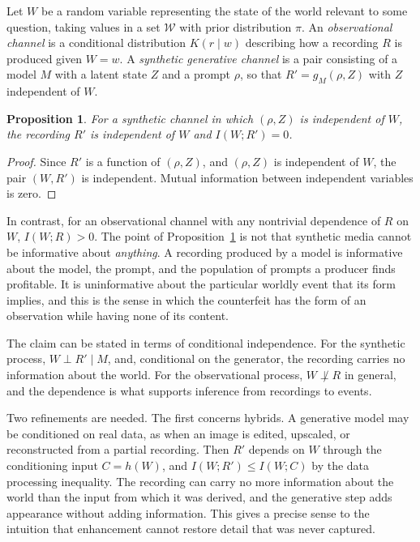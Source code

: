 \documentclass[12pt]{article}
\theoremstyle{plain}
\newtheorem{proposition}{Proposition}
\theoremstyle{definition}
\theoremstyle{remark}
\begin{document}
Let $W$ be a random variable representing the state of the world relevant to some question, taking values in a set $\mathcal{W}$ with prior distribution $\pi$. An \emph{observational channel} is a conditional distribution $K(r \mid w)$ describing how a recording $R$ is produced given $W = w$. A \emph{synthetic generative channel} is a pair consisting of a model $M$ with a latent state $Z$ and a prompt $\rho$, so that $R' = g_M(\rho, Z)$ with $Z$ independent of $W$.

\begin{proposition}\label{prop:A1}
For a synthetic channel in which $(\rho, Z)$ is independent of $W$, the recording $R'$ is independent of $W$ and $I(W; R') = 0$.
\end{proposition}

\begin{proof}
Since $R'$ is a function of $(\rho, Z)$, and $(\rho, Z)$ is independent of $W$, the pair $(W, R')$ is independent. Mutual information between independent variables is zero.
\end{proof}

In contrast, for an observational channel with any nontrivial dependence of $R$ on $W$, $I(W; R) > 0$. The point of Proposition~\ref{prop:A1} is not that synthetic media cannot be informative about \emph{anything}. A recording produced by a model is informative about the model, the prompt, and the population of prompts a producer finds profitable. It is uninformative about the particular worldly event that its form implies, and this is the sense in which the counterfeit has the form of an observation while having none of its content.

The claim can be stated in terms of conditional independence. For the synthetic process, $W \perp R' \mid M$, and, conditional on the generator, the recording carries no information about the world. For the observational process, $W \not\perp R$ in general, and the dependence is what supports inference from recordings to events.

Two refinements are needed. The first concerns hybrids. A generative model may be conditioned on real data, as when an image is edited, upscaled, or reconstructed from a partial recording. Then $R'$ depends on $W$ through the conditioning input $C = h(W)$, and $I(W; R') \le I(W; C)$ by the data processing inequality. The recording can carry no more information about the world than the input from which it was derived, and the generative step adds appearance without adding information. This gives a precise sense to the intuition that enhancement cannot restore detail that was never captured.
\end{document}

